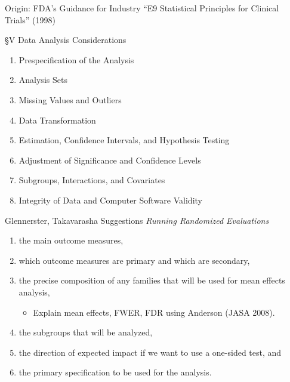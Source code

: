 \documentclass{beamer}
\begin{document}
\begin{frame}{Origin: FDA's Guidance for Industry}
``E9 Statistical Principles for Clinical Trials'' (1998)
\href{http://www.fda.gov/downloads/drugs/guidancecomplianceregulatoryinformation/guidances/ucm073137.pdf}{}

\S V Data Analysis Considerations
\begin{enumerate}[<.->]
\item Prespecification of the Analysis
\item Analysis Sets
\item Missing Values and Outliers
\item Data Transformation
\item Estimation, Confidence Intervals, and Hypothesis Testing
\item Adjustment of Significance and Confidence Levels
\item Subgroups, Interactions, and Covariates
\item Integrity of Data and Computer Software Validity
\end{enumerate}
\end{frame}


\begin{frame}{Glennerster, Takavarasha Suggestions}
\textit{Running Randomized Evaluations}
\begin{enumerate}[<.->]
\def\labelenumi{\arabic{enumi}.}
\item
  the main outcome measures,
\item
  which outcome measures are primary and which are secondary,
\item
  the precise composition of any families that will be used for mean
  effects analysis,
  \begin{itemize}
  \item Explain mean effects, FWER, FDR using Anderson (JASA 2008).
  \end{itemize}
\item
  the subgroups that will be analyzed,
\item
  the direction of expected impact if we want to use a one-sided test,
  and
\item
  the primary specification to be used for the analysis.
\end{enumerate}
\end{frame}
\end{document}
